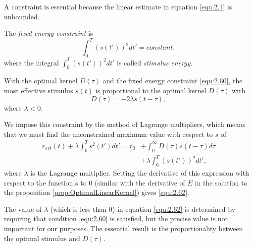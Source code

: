 \begin{rem}
  A constraint is essential because the linear estimate in equation \ref{equ:2.1} is unbounded.
\end{rem}

\begin{defn}
  \label{def:stimulusEnergy}
  The \emph{fixed energy constraint} is
  \begin{equation}
    \label{equ:2.60}
    \int_0^T\left(s(t')\right)^2dt' = constant,
  \end{equation}
  where the integral $\int_0^T\left(s(t')\right)^2dt'$ is called \emph{stimulus energy}.
\end{defn}

\begin{prop}
  \label{prop:mostEffectiveStimulus}
  With the optimal kernel $D(\tau)$ and the fixed energy constraint \ref{equ:2.60}, the most effective stimulus $s(t)$ is proportional to the optimal kernel $D(\tau)$ with
  \begin{equation}
    \label{equ:2.62}
    D(\tau) = -2\lambda s(t-\tau),
  \end{equation}
  where $\lambda < 0$. 
\end{prop}
\begin{solution}
  We impose this constraint by the method of Lagrange multipliers, which means that we must find the unconstrained maximum value with respect to $s$ of
  \begin{equation}
    \label{equ:2.61}
    \begin{aligned}
      r_{est}(t)+\lambda\int_0^Ts^2(t')dt' = r_0&+\int_0^{\infty}D(\tau)s(t-\tau)d\tau \\
      &+ \lambda\int_0^T\left(s(t')\right)^2dt',
    \end{aligned}
  \end{equation}
  where $\lambda$ is the Lagrange multiplier. Setting the derivative of this expression with respect to the function s to 0 (similar with the derivative of $E$ in the solution to the proposition \ref{prop:OptimalLinearKernel}) gives \ref{equ:2.62}.
\end{solution}

\begin{rem}
  The value of $\lambda$ (which is less than $0$) in equation \ref{equ:2.62} is determined by requiring that condition \ref{equ:2.60} is satisfied, but the precise value is not important for our purposes. The essential result is the proportionality between the optimal stimulus and $D(\tau)$.
\end{rem}

